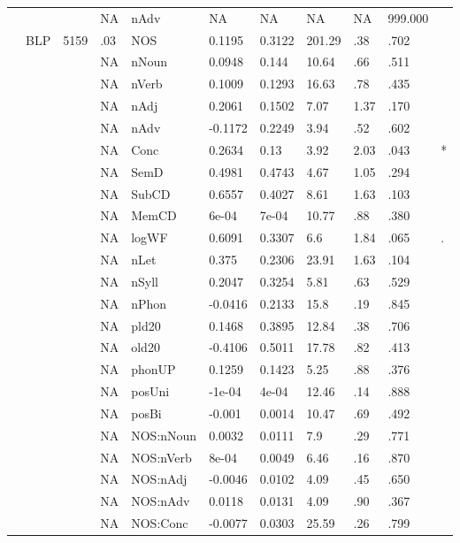 \begin{table}[ht]
\begin{tabular}{lllllllllll}
   &  &  & NA & nAdv & NA & NA & NA & NA & 999.000 &  \\ 
   & BLP & 5159 & .03 & NOS & 0.1195 & 0.3122 & 201.29 & .38 & .702 &   \\ 
   &  &  & NA & nNoun & 0.0948 & 0.144 & 10.64 & .66 & .511 &   \\ 
   &  &  & NA & nVerb & 0.1009 & 0.1293 & 16.63 & .78 & .435 &   \\ 
   &  &  & NA & nAdj & 0.2061 & 0.1502 & 7.07 & 1.37 & .170 &   \\ 
   &  &  & NA & nAdv & -0.1172 & 0.2249 & 3.94 & .52 & .602 &   \\ 
   &  &  & NA & Conc & 0.2634 & 0.13 & 3.92 & 2.03 & .043 & * \\ 
   &  &  & NA & SemD & 0.4981 & 0.4743 & 4.67 & 1.05 & .294 &   \\ 
   &  &  & NA & SubCD & 0.6557 & 0.4027 & 8.61 & 1.63 & .103 &   \\ 
   &  &  & NA & MemCD & 6e-04 & 7e-04 & 10.77 & .88 & .380 &   \\ 
   &  &  & NA & logWF & 0.6091 & 0.3307 & 6.6 & 1.84 & .065 & . \\ 
   &  &  & NA & nLet & 0.375 & 0.2306 & 23.91 & 1.63 & .104 &   \\ 
   &  &  & NA & nSyll & 0.2047 & 0.3254 & 5.81 & .63 & .529 &   \\ 
   &  &  & NA & nPhon & -0.0416 & 0.2133 & 15.8 & .19 & .845 &   \\ 
   &  &  & NA & pld20 & 0.1468 & 0.3895 & 12.84 & .38 & .706 &   \\ 
   &  &  & NA & old20 & -0.4106 & 0.5011 & 17.78 & .82 & .413 &   \\ 
   &  &  & NA & phonUP & 0.1259 & 0.1423 & 5.25 & .88 & .376 &   \\ 
   &  &  & NA & posUni & -1e-04 & 4e-04 & 12.46 & .14 & .888 &   \\ 
   &  &  & NA & posBi & -0.001 & 0.0014 & 10.47 & .69 & .492 &   \\ 
   &  &  & NA & NOS:nNoun & 0.0032 & 0.0111 & 7.9 & .29 & .771 &   \\ 
   &  &  & NA & NOS:nVerb & 8e-04 & 0.0049 & 6.46 & .16 & .870 &   \\ 
   &  &  & NA & NOS:nAdj & -0.0046 & 0.0102 & 4.09 & .45 & .650 &   \\ 
   &  &  & NA & NOS:nAdv & 0.0118 & 0.0131 & 4.09 & .90 & .367 &   \\ 
   &  &  & NA & NOS:Conc & -0.0077 & 0.0303 & 25.59 & .26 & .799 &   \\ 

\end{tabular}
\end{table}
